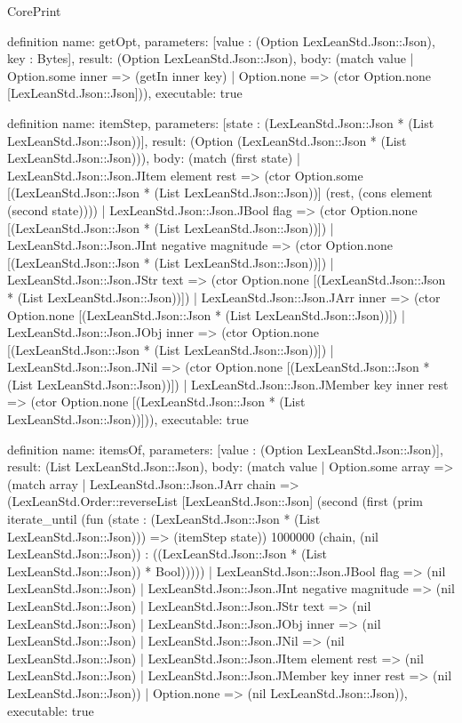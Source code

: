 \begin{lexlean}{CorePrint}
\begin{semanticmodule}
definition{
  name: getOpt,
  parameters: [value : (Option LexLeanStd.Json::Json), key : Bytes],
  result: (Option LexLeanStd.Json::Json),
  body: (match value
    | Option.some inner => (getIn inner key)
    | Option.none => (ctor Option.none [LexLeanStd.Json::Json])),
  executable: true
}

definition{
  name: itemStep,
  parameters: [state : (LexLeanStd.Json::Json * (List LexLeanStd.Json::Json))],
  result: (Option (LexLeanStd.Json::Json * (List LexLeanStd.Json::Json))),
  body: (match (first state)
    | LexLeanStd.Json::Json.JItem element rest => (ctor Option.some [(LexLeanStd.Json::Json * (List LexLeanStd.Json::Json))] (rest, (cons element (second state))))
    | LexLeanStd.Json::Json.JBool flag => (ctor Option.none [(LexLeanStd.Json::Json * (List LexLeanStd.Json::Json))])
    | LexLeanStd.Json::Json.JInt negative magnitude => (ctor Option.none [(LexLeanStd.Json::Json * (List LexLeanStd.Json::Json))])
    | LexLeanStd.Json::Json.JStr text => (ctor Option.none [(LexLeanStd.Json::Json * (List LexLeanStd.Json::Json))])
    | LexLeanStd.Json::Json.JArr inner => (ctor Option.none [(LexLeanStd.Json::Json * (List LexLeanStd.Json::Json))])
    | LexLeanStd.Json::Json.JObj inner => (ctor Option.none [(LexLeanStd.Json::Json * (List LexLeanStd.Json::Json))])
    | LexLeanStd.Json::Json.JNil => (ctor Option.none [(LexLeanStd.Json::Json * (List LexLeanStd.Json::Json))])
    | LexLeanStd.Json::Json.JMember key inner rest => (ctor Option.none [(LexLeanStd.Json::Json * (List LexLeanStd.Json::Json))])),
  executable: true
}

definition{
  name: itemsOf,
  parameters: [value : (Option LexLeanStd.Json::Json)],
  result: (List LexLeanStd.Json::Json),
  body: (match value
    | Option.some array => (match array
      | LexLeanStd.Json::Json.JArr chain => (LexLeanStd.Order::reverseList [LexLeanStd.Json::Json] (second (first (prim iterate_until (fun (state : (LexLeanStd.Json::Json * (List LexLeanStd.Json::Json))) => (itemStep state)) 1000000 (chain, (nil LexLeanStd.Json::Json)) : ((LexLeanStd.Json::Json * (List LexLeanStd.Json::Json)) * Bool)))))
      | LexLeanStd.Json::Json.JBool flag => (nil LexLeanStd.Json::Json)
      | LexLeanStd.Json::Json.JInt negative magnitude => (nil LexLeanStd.Json::Json)
      | LexLeanStd.Json::Json.JStr text => (nil LexLeanStd.Json::Json)
      | LexLeanStd.Json::Json.JObj inner => (nil LexLeanStd.Json::Json)
      | LexLeanStd.Json::Json.JNil => (nil LexLeanStd.Json::Json)
      | LexLeanStd.Json::Json.JItem element rest => (nil LexLeanStd.Json::Json)
      | LexLeanStd.Json::Json.JMember key inner rest => (nil LexLeanStd.Json::Json))
    | Option.none => (nil LexLeanStd.Json::Json)),
  executable: true
}


\end{semanticmodule}
\end{lexlean}
